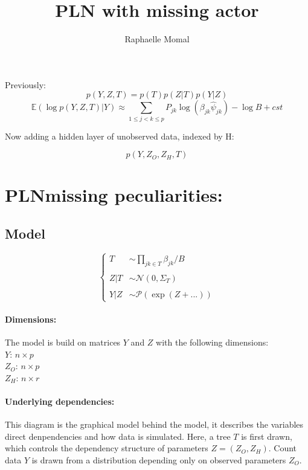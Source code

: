 \documentclass[11pt,a4paper]{article}
\author{Raphaelle Momal}
\title{PLN with missing actor}
\newcommand{\edgeunit}{1.5}
\newcommand{\Esp}{\mathds{E}}
\begin{document}
\maketitle
\vspace{3cm}
\tableofcontents
\newpage
Previously:
$$ p(Y,Z,T) = p(T)p(Z|T)p(Y|Z)$$
$$ \Esp(\log p(Y,Z,T)|Y) \approx \sum_{1 \leq j < k \leq p} P_{jk} \log\left(\beta_{jk} \hat{\psi}_{jk}\right) - \log B + cst$$

Now adding a hidden layer of unobserved data, indexed by H:

$$ p(Y,Z_O,Z_H,T)$$
\section{PLNmissing peculiarities:}

\subsection{Model}

$$\left\{\begin{array}{rl}
T & \sim\prod_{jk \in T} \beta_{jk}/B \\\\
Z|T& \sim\mathcal{N}(0,\Sigma_T)\\\\
Y|Z&\sim\mathcal{P}( \exp( Z+...) )
\end{array} \right.$$

\paragraph{Dimensions:}
The model is build on matrices $Y$ and $Z$ with the following dimensions:\\
$Y$: $n\times p$\\
$Z_O$: $n\times p$\\
$Z_H$: $n\times r$


\paragraph{Underlying dependencies:} This diagram is the graphical model behind the model, it describes the variables direct denpendencies and how data is simulated. Here, a tree $T$ is first drawn, which controls the dependency structure of parameters $Z = (Z_O,Z_H)$. Count data $Y$ is drawn from a distribution depending only on observed parameters $Z_O$.
\begin{center}
\end{center}
\end{document}
